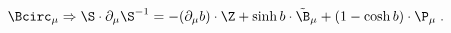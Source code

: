 \begin{equation}
\label{e5:56}
\Bcirc_{\mu} \Rightarrow \S \cdot \partial_{\mu} \S^{-1} = -(\partial_{\mu} b)\cdot \Z + \sinh b \cdot \tilde{\B}_{\mu} +(1- \cosh b)\cdot \P_{\mu} \; .
\end{equation}

